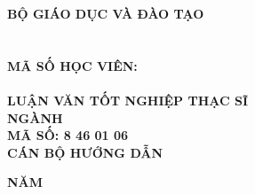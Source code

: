 \begin{titlepage}


\begin{center}

{\fontsize{14}{0pt}\selectfont\bfseries BỘ GIÁO DỤC VÀ ĐÀO TẠO}\\
\textbf{\fontsize{14}{0pt}\selectfont\university}
\\[2cm]

\textbf{\fontsize{14}{0pt}\selectfont\MakeUppercase\student}\\
\textbf{\fontsize{14}{0pt}\selectfont MÃ SỐ HỌC VIÊN: \MakeUppercase\studentid}
\\[3cm]

\textbf{{\fontsize{20}{0pt}\selectfont\MakeUppercase \nametitle}}
\\[3cm]

\textbf{\fontsize{16}{0pt}\selectfont LUẬN VĂN TỐT NGHIỆP THẠC SĨ}\\[1em]

\textbf{\fontsize{14}{0pt}\selectfont NGÀNH \MakeUppercase \major}\\[1em]
\textbf{\fontsize{14}{0pt}\selectfont MÃ SỐ: 8 46 01 06}
\\[2cm]

\textbf{\fontsize{13}{0pt}\selectfont CÁN BỘ HƯỚNG DẪN\\\fontsize{13}{0pt}\selectfont \MakeUppercase \MainAdvisor}

\vfill
\textbf{\fontsize{14}{0pt}\selectfont NĂM \yeardone}

\end{center}


\end{titlepage}